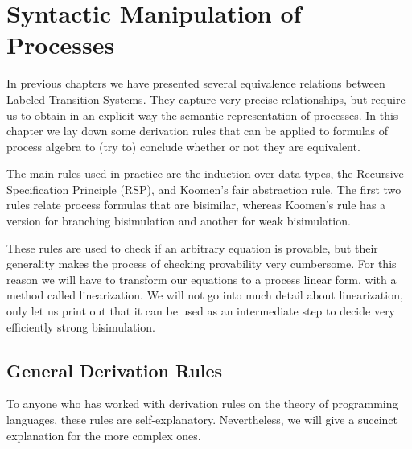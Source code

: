 \documentclass[11pt]{article}
\theoremstyle{definition}
\theoremstyle{plain}
\begin{document}
\section{Syntactic Manipulation of Processes}
In previous chapters we have presented several equivalence relations between Labeled Transition Systems. They capture very precise relationships, but require us to obtain in an explicit way the semantic representation of processes. In this chapter we lay down some derivation rules that can be applied to formulas of process algebra to (try to) conclude whether or not they are equivalent.

The main rules used in practice are the induction over data types, the Recursive Specification Principle (RSP), and Koomen's fair abstraction rule. The first two rules relate process formulas that are bisimilar, whereas Koomen's rule has a version for branching bisimulation and another for weak bisimulation.

These rules are used to check if an arbitrary equation is provable, but their generality makes the process of checking provability very cumbersome. For this reason we will have to transform our equations to a process linear form, with a method called linearization. We will not go into much detail about linearization, only let us print out that it can be used as an intermediate step to decide very efficiently strong bisimulation\cite{HIRSHFELD1996143}.

\subsection{General Derivation Rules}

To anyone who has worked with derivation rules on the theory of programming languages, these rules are self-explanatory. Nevertheless, we will give a succinct explanation for the more complex ones.
\end{document}
